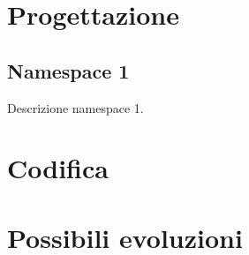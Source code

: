 \section{Progettazione}

\subsection*{Namespace 1}
Descrizione namespace 1.

\begin{namespacedesc}
\end{namespacedesc}

\section{Codifica}

\section{Possibili evoluzioni}
